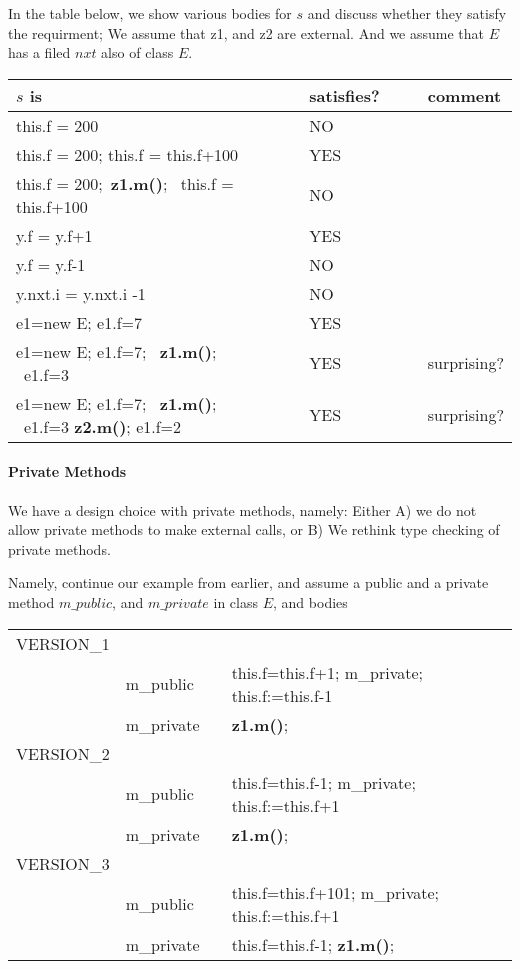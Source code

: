 \vspace{.1cm}

In the table below, we show various bodies for $s$ and discuss whether they satisfy the requirment; We assume that z1, and z2 are   external. And we assume that $E$ has a filed $nxt$ also of class $E$.

\begin{tabular}{lclcl}
$s$ is & & satisfies? &  & comment\\
\hline  
 this.f = 200  &\ \  & NO\\
  this.f = 200; this.f = this.f+100  & & YES\\
  this.f = 200;\   \textbf{z1.m()};  \ this.f = this.f+100  & & NO\\
  y.f = y.f+1   & & YES   \\
  y.f = y.f-1   & & NO & \ \  &  \\
 y.nxt.i = y.nxt.i -1   & & NO\\
 e1=new E; e1.f=7 & & YES\\
 e1=new E; e1.f=7; \   \textbf{z1.m()};  \ e1.f=3 &  & YES & & surprising?\\
  e1=new E; e1.f=7; \  \textbf{z1.m()};  \ e1.f=3  \textbf{z2.m()};  e1.f=2 &  & YES & & surprising?\\
 \hline
\end{tabular}

\paragraph{Private Methods}
\label{s:privateMs}
We have a design choice with private methods, namely: Either A) we do not allow private methods to make external calls, or B) We rethink type checking of
private methods. 

Namely, continue our example from earlier, and assume a public and a private method $m\_public$, and $m\_private$ in class $E$, and bodies\\
\begin{tabular}{clclcl}
VERSION\_1\\
& m\_public & & this.f=this.f+1; m\_private; this.f:=this.f-1 \\
& m\_private & &\textbf{z1.m()};\\
VERSION\_2\\
& m\_public & & this.f=this.f-1; m\_private; this.f:=this.f+1 \\
& m\_private & &\textbf{z1.m()};\\
VERSION\_3\\
& m\_public & & this.f=this.f+101; m\_private; this.f:=this.f+1 \\
& m\_private & &this.f=this.f-1; \textbf{z1.m()};
\end{tabular}

